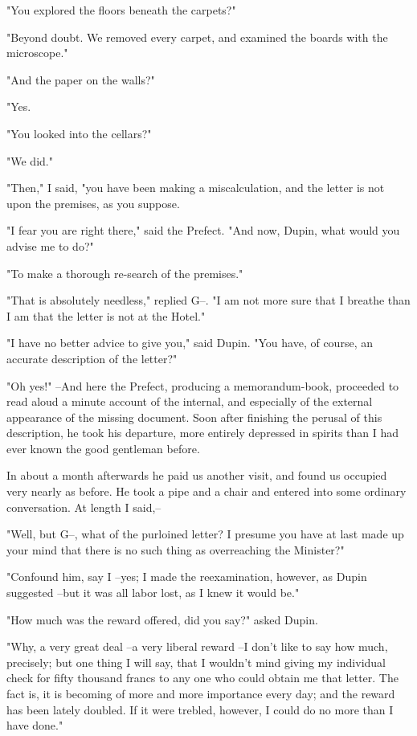 \documentclass{article}
\begin{document}
"You explored the floors beneath the carpets?"

"Beyond doubt. We removed every carpet, and examined the boards with the microscope."

"And the paper on the walls?"

"Yes.

"You looked into the cellars?"

"We did."

"Then," I said, "you have been making a miscalculation, and the letter is not upon the premises, as you suppose.

"I fear you are right there," said the Prefect. "And now, Dupin, what would you advise me to do?"

"To make a thorough re-search of the premises."

"That is absolutely needless," replied G--. "I am not more sure that I breathe than I am that the letter is not at the Hotel."

"I have no better advice to give you," said Dupin. "You have, of course, an accurate description of the letter?"

"Oh yes!" --And here the Prefect, producing a memorandum-book, proceeded to read aloud a minute account of the internal, and especially of the external appearance of the missing document. Soon after finishing the perusal of this description, he took his departure, more entirely depressed in spirits than I had ever known the good gentleman before.

In about a month afterwards he paid us another visit, and found us occupied very nearly as before. He took a pipe and a chair and entered into some ordinary conversation. At length I said,--

"Well, but G--, what of the purloined letter? I presume you have at last made up your mind that there is no such thing as overreaching the Minister?"

"Confound him, say I --yes; I made the reexamination, however, as Dupin suggested --but it was all labor lost, as I knew it would be."

"How much was the reward offered, did you say?" asked Dupin.

"Why, a very great deal --a very liberal reward --I don't like to say how much, precisely; but one thing I will say, that I wouldn't mind giving my individual check for fifty thousand francs to any one who could obtain me that letter. The fact is, it is becoming of more and more importance every day; and the reward has been lately doubled. If it were trebled, however, I could do no more than I have done."
\end{document}
